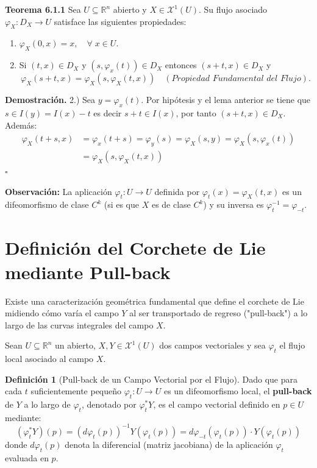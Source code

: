 \documentclass[11pt,a4paper]{article}
\theoremstyle{definition}
\newtheorem{definicion}{Definición}[section]
\theoremstyle{plain}
\theoremstyle{remark}
\begin{document}
	\noindent \textbf{Teorema 6.1.1} Sea $U \subseteq \mathbb{R}^n$ abierto y $X \in \mathcal{X}^1(U)$. Su flujo asociado $\varphi_X : D_X \to U$ satisface las siguientes propiedades:
	
	\begin{enumerate}
		\item $\varphi_X(0, x) = x, \quad \forall \; x \in U$.
		\item Si $(t, x) \in D_X$ y $(s, \varphi_x(t)) \in D_X$ entonces $(s + t, x) \in D_X$ y
		\[
		\varphi_X(s + t, x) = \varphi_X(s, \varphi_X(t, x)) \quad (\textit{Propiedad Fundamental del Flujo}).
		\]
	\end{enumerate}
	
	\noindent \textbf{Demostración.} 2.) Sea $y = \varphi_x(t)$. Por hipótesis y el lema anterior se tiene que $s \in I(y) = I(x) - t$ es decir $s + t \in I(x)$, por tanto $(s + t, x) \in D_X$. Además:
	\[
	\begin{aligned}
		\varphi_X(t + s, x) &= \varphi_x(t + s) = \varphi_y(s) = \varphi_X(s, y) = \varphi_X(s, \varphi_x(t)) \\
		&= \varphi_X(s, \varphi_X(t, x))
	\end{aligned}
	\]
	\hfill $\square$
	
	\textbf{Observación:} La aplicación $\varphi_t:U\to U$ definida por $\varphi_t(x) = \varphi_X(t,x)$ es un difeomorfismo de clase $C^k$ (si es que $X$ es de clase $C^k$) y su inversa es $\varphi_t^{-1} = \varphi_{-t}$.
	
	\section*{Definición del Corchete de Lie mediante Pull-back}
	
	Existe una caracterización geométrica fundamental que define el corchete de Lie midiendo cómo varía el campo $Y$ al ser transportado de regreso ("pull-back") a lo largo de las curvas integrales del campo $X$.
	
	Sean $U \subseteq \mathbb{R}^n$ un abierto, $X, Y \in \mathcal{X}^1(U)$ dos campos vectoriales y sea $\varphi_t$ el flujo local asociado al campo $X$.
	
	\begin{definicion}[Pull-back de un Campo Vectorial por el Flujo]
		Dado que para cada $t$ suficientemente pequeño $\varphi_t : U \to U$ es un difeomorfismo local, el \textbf{pull-back} de $Y$ a lo largo de $\varphi_t$, denotado por $\varphi_t^* Y$, es el campo vectorial definido en $p \in U$ mediante:
		\[
		(\varphi_t^* Y)(p) = \left( d\varphi_t(p) \right)^{-1} Y(\varphi_t(p)) = d\varphi_{-t}(\varphi_t(p)) \cdot Y(\varphi_t(p))
		\]
		donde $d\varphi_t(p)$ denota la diferencial (matriz jacobiana) de la aplicación $\varphi_t$ evaluada en $p$.
	\end{definicion}
	
\end{document}

